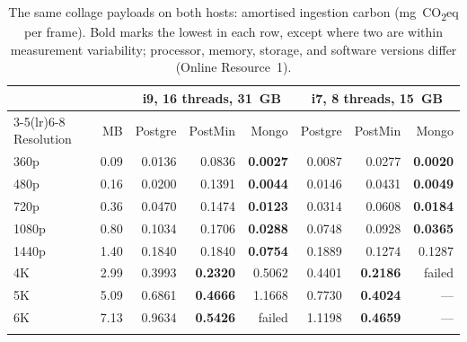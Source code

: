 \documentclass[pdflatex,sn-basic]{sn-jnl}%
\begin{document}
\begin{table}[htbp]
\caption{The same collage payloads on both hosts: amortised ingestion carbon (mg~CO\textsubscript{2}eq per frame). Bold marks the lowest in each row, except where two are within measurement variability; processor, memory, storage, and software versions differ (Online Resource~1).}\label{tab:twohosts}
\small
\setlength{\tabcolsep}{4pt}
\begin{tabular}{@{}lr rrr rrr@{}}
\toprule
 & & \multicolumn{3}{c}{i9, 16 threads, 31~GB} & \multicolumn{3}{c}{i7, 8 threads, 15~GB} \\
\cmidrule(lr){3-5}\cmidrule(lr){6-8}
Resolution & MB & Postgre & PostMin & Mongo & Postgre & PostMin & Mongo \\
\midrule
360p  & 0.09 & 0.0136 & 0.0836 & \textbf{0.0027} & 0.0087 & 0.0277 & \textbf{0.0020} \\
480p  & 0.16 & 0.0200 & 0.1391 & \textbf{0.0044} & 0.0146 & 0.0431 & \textbf{0.0049} \\
720p  & 0.36 & 0.0470 & 0.1474 & \textbf{0.0123} & 0.0314 & 0.0608 & \textbf{0.0184} \\
1080p & 0.80 & 0.1034 & 0.1706 & \textbf{0.0288} & 0.0748 & 0.0928 & \textbf{0.0365} \\
\midrule
1440p & 1.40 & 0.1840 & 0.1840 & \textbf{0.0754} & 0.1889 & 0.1274 & 0.1287 \\
4K    & 2.99 & 0.3993 & \textbf{0.2320} & 0.5062 & 0.4401 & \textbf{0.2186} & failed \\
5K    & 5.09 & 0.6861 & \textbf{0.4666} & 1.1668 & 0.7730 & \textbf{0.4024} & --- \\
6K    & 7.13 & 0.9634 & \textbf{0.5426} & failed & 1.1198 & \textbf{0.4659} & --- \\
\botrule
\end{tabular}
\end{table}
\end{document}
